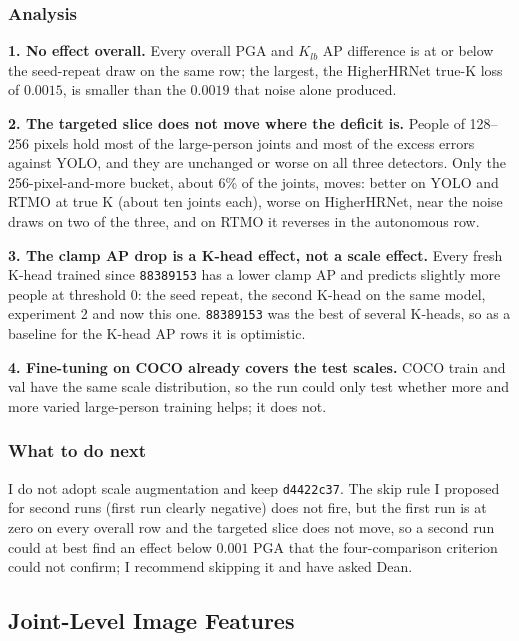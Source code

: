 \subsubsection{Analysis}

\textbf{1. No effect overall.} Every overall PGA and $K_{lb}$ AP difference is at or below the seed-repeat draw on the same row; the largest, the HigherHRNet true-K loss of $0.0015$, is smaller than the $0.0019$ that noise alone produced.

\textbf{2. The targeted slice does not move where the deficit is.} People of 128--256 pixels hold most of the large-person joints and most of the excess errors against YOLO, and they are unchanged or worse on all three detectors. Only the 256-pixel-and-more bucket, about 6\% of the joints, moves: better on YOLO and RTMO at true K (about ten joints each), worse on HigherHRNet, near the noise draws on two of the three, and on RTMO it reverses in the autonomous row.

\textbf{3. The clamp AP drop is a K-head effect, not a scale effect.} Every fresh K-head trained since \texttt{88389153} has a lower clamp AP and predicts slightly more people at threshold 0: the seed repeat, the second K-head on the same model, experiment 2 and now this one. \texttt{88389153} was the best of several K-heads, so as a baseline for the K-head AP rows it is optimistic.

\textbf{4. Fine-tuning on COCO already covers the test scales.} COCO train and val have the same scale distribution, so the run could only test whether more and more varied large-person training helps; it does not.

\subsubsection{What to do next}

I do not adopt scale augmentation and keep \texttt{d4422c37}.
The skip rule I proposed for second runs (first run clearly negative) does not fire, but the first run is at zero on every overall row and the targeted slice does not move, so a second run could at best find an effect below $0.001$ PGA that the four-comparison criterion could not confirm; I recommend skipping it and have asked Dean.

\subsection{Joint-Level Image Features}

